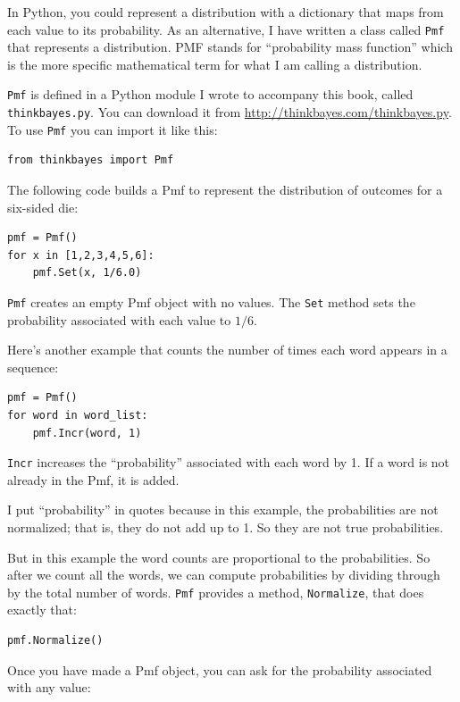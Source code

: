\documentclass[12pt]{book}
\begin{document}
In Python, you could represent a distribution with a dictionary that
maps from each value to its probability.  As an alternative, I have
written a class called {\tt Pmf} that represents a distribution.  PMF
stands for ``probability mass function'' which is the more specific
mathematical term for what I am calling a distribution.

{\tt Pmf} is defined in a Python module I wrote to accompany this
book, called {\tt thinkbayes.py}.  You can download it from
\url{http://thinkbayes.com/thinkbayes.py}.  To use {\tt Pmf} you
can import it like this:

\begin{verbatim}
from thinkbayes import Pmf
\end{verbatim}

The following code builds a Pmf to represent the distribution
of outcomes for a six-sided die:

\begin{verbatim}
pmf = Pmf()
for x in [1,2,3,4,5,6]:
    pmf.Set(x, 1/6.0)
\end{verbatim}

\verb"Pmf" creates an empty Pmf object with no values.  The
\verb"Set" method sets the probability associated with each
value to $1/6$.

Here's another example that counts the number of times each word
appears in a sequence:

\begin{verbatim}
pmf = Pmf()
for word in word_list:
    pmf.Incr(word, 1)
\end{verbatim}

\verb"Incr" increases the ``probability'' associated with each
word by 1.  If a word is not already in the Pmf, it is added.

I put ``probability'' in quotes because in this example, the
probabilities are not normalized; that is, they do not add up to 1.
So they are not true probabilities.

But in this example the word counts are proportional to the probabilities.
So after we count all the words, we can compute probabilities by
dividing through by the total number of words.  {\tt Pmf} provides
a method, \verb"Normalize", that does exactly that:

\begin{verbatim}
pmf.Normalize()
\end{verbatim}

Once you have made a Pmf object, you can ask for the probability
associated with any value:
\end{document}
